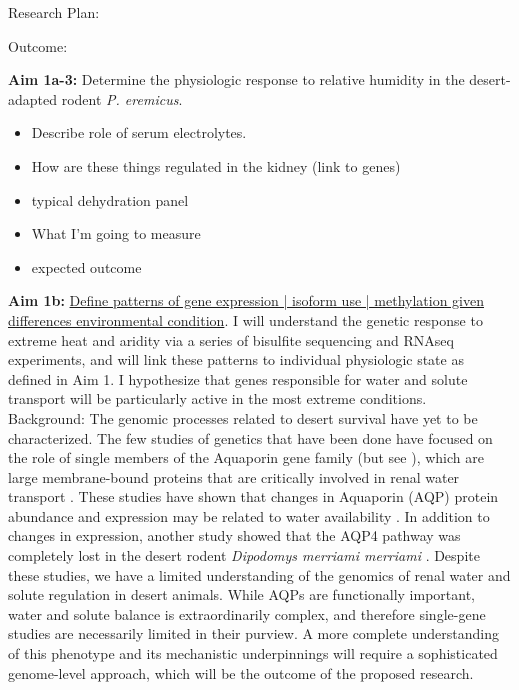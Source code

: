 \documentclass[11pt]{article}
\begin{document}
Research Plan: 

Outcome:

\noindent \textbf{Aim 1a-3:} Determine the physiologic response to relative humidity in the desert-adapted rodent \textit{P. eremicus}. \\  

\begin{itemize}
\item Describe role of serum electrolytes.
\item How are these things regulated in the kidney (link to genes)
\item typical dehydration panel
\item What I'm going to measure
\item expected outcome
\end{itemize}



\noindent \textbf{Aim 1b:} \ul{Define patterns of gene expression | isoform use | methylation given differences environmental condition}. {I will understand the genetic response to extreme heat and aridity via a series of bisulfite sequencing and RNAseq experiments, and will link these patterns to individual physiologic state as defined in Aim 1.} I hypothesize that genes responsible for water and solute transport will be particularly active in the most extreme conditions.\\

Background: The genomic processes related to desert survival have yet to be characterized. The few studies of genetics that have been done have focused on the role of single members of the Aquaporin gene family (but see \cite{Bartolo:2007hy}), which are large membrane-bound proteins that are critically involved in renal water transport \citep{Kwon:2009bv,Verkman:2002ww,Brown:1995vo,Nielsen:1995cb}. These studies have shown that changes in Aquaporin (AQP) protein abundance and expression may be related to water availability \citep{Boselt:2009fb, Gallardo:2005fm,Bozinovic:2003eg}. In addition to changes in expression, another study showed that the AQP4 pathway was completely lost in the desert rodent \textit{Dipodomys merriami merriami} \citep{Huang:2001ti}. Despite these studies, we have a limited understanding of the genomics of renal water and solute regulation in desert animals. While AQPs are functionally important, water and solute balance is extraordinarily complex, and therefore single-gene studies are necessarily limited in their purview. A more complete understanding of this phenotype and its mechanistic underpinnings will require a sophisticated genome-level approach, which will be the outcome of the proposed research.  
\end{document}
